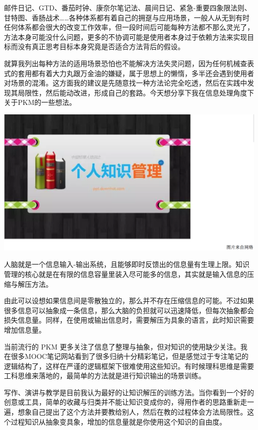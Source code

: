\documentclass[]{book}
\begin{document}
邮件日记、GTD、番茄时钟、康奈尔笔记法、晨间日记、紧急-重要四象限法则、甘特图、香肠战术\ldots{}\ldots{}各种体系都有着自己的拥趸与应用场景，一般人从无到有时任何体系都会很大的改变工作效率，但一段时间后可能每种方法都不那么灵光了，方法本身可能没什么问题，更多的不协调可能是使用者本身过于依赖方法来实现目标而没有真正思考目标本身究竟是否适合方法背后的假设。

就算我列出每种方法的适用场景恐怕也不能解决方法失灵问题，因为任何机械查表式的套用都有着大力丸跟万金油的嫌疑，属于思想上的懒惰，多半还会遇到使用者对场景的混淆。这方面我的建议是先随意找一种方法论完全吃透，然后在实践中发现其局限性，然后能动改进，形成自己的套路。今天想分享下我在信息处理角度下关于PKM的一些想法。

\includegraphics[width=8.33in]{images/gtd2}

人脑就是一个信息输入-输出系统，且能够即时反馈出的信息量有生理上限。知识管理的核心就是在有限的信息容量里装入尽可能多的信息，其实就是输入信息的压缩与解压方法。

由此可以设想如果信息间是零散独立的，那么并不存在压缩信息的可能。不过如果很多信息可以抽象成一条信息，那么大脑的负担就可以迅速降低，但每次抽象都会损失信息量。同样，在使用或输出信息时，需要解压为具象的语言，此时知识需要增加信息量。

当前流行的 PKM 更多关注了信息了整理与抽象，但对知识的使用缺少关注。我在很多MOOC笔记网站看到了很多归纳十分精彩笔记，但是感觉过于专注笔记的逻辑结构了，这样在严谨的逻辑框架下很难使用这些知识。有时候理科思维是需要工科思维来落地的，最简单的方法就是进行知识输出的场景训练。

写作、演讲与教学是目前我认为最好的让知识解压的训练方法。当你看到一个好的创意或工具，简单的收藏与归类并不能让知识变成你的，得用作者的思路重新走一遍，想象自己提出了这个方法并要教给别人，然后在教的过程体会方法局限性。这个过程知识从抽象变具象，增加的信息量就是你使用这个知识的自由度。
\end{document}
